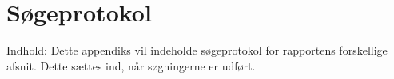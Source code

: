 \chapter{Søgeprotokol}\label{app:soegeprotokol}
Indhold: Dette appendiks vil indeholde søgeprotokol for rapportens forskellige afsnit. Dette sættes ind, når søgningerne er udført. 